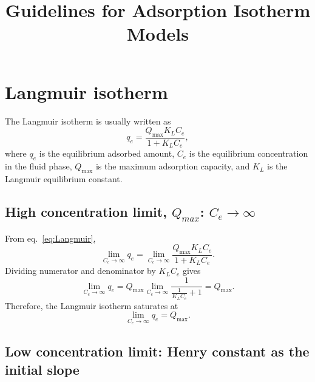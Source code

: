\documentclass[12pt]{article}
\begin{document}
	\title{Guidelines for Adsorption Isotherm Models}
	\maketitle

	\tableofcontents
	\newpage

	\section{Langmuir isotherm}
	
	The Langmuir isotherm is usually written as
	\begin{equation}
		q_e = \frac{Q_{\max} K_L C_e}{1 + K_L C_e},
		\label{eq:Langmuir}
	\end{equation}
	where \(q_e\) is the equilibrium adsorbed amount, \(C_e\) is the equilibrium
	concentration in the fluid phase, \(Q_{\max}\) is the maximum adsorption
	capacity, and \(K_L\) is the Langmuir equilibrium constant.
	
	\subsection{High concentration limit, $Q_{max}$: \(C_e \to \infty\)}
	
	From eq.~\eqref{eq:Langmuir},
	\begin{equation}
		\lim_{C_e \to \infty} q_e
		= \lim_{C_e \to \infty}
		\frac{Q_{\max} K_L C_e}{1 + K_L C_e}.
	\end{equation}
	Dividing numerator and denominator by \(K_L C_e\) gives
	\begin{equation}
		\lim_{C_e \to \infty} q_e
		= Q_{\max} \lim_{C_e \to \infty}
		\frac{1}{\frac{1}{K_L C_e} + 1}
		= Q_{\max}.
	\end{equation}
	Therefore, the Langmuir isotherm saturates at
	\begin{equation}
		\boxed{\displaystyle \lim_{C_e \to \infty} q_e = Q_{\max}}.
	\end{equation}
	
	\subsection{Low concentration limit: Henry constant as the initial slope}
	
\end{document}
